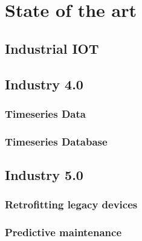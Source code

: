 \chapter{State of the art}
\label{cha:intro}
\section{Industrial IOT}
\section{Industry 4.0}
\subsection{Timeseries Data}
\subsection{Timeseries Database}
\section{Industry 5.0}
\subsection{Retrofitting legacy devices}
\subsection{Predictive maintenance}
